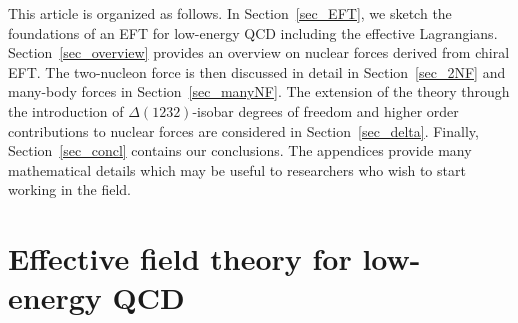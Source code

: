 \documentclass[sort&compress,preprint,3p]{elsarticle}
\begin{document}
This article is organized as follows.
In Section~\ref{sec_EFT}, we sketch the foundations of an EFT for low-energy
QCD including the effective Lagrangians. Section~\ref{sec_overview} provides an overview
on nuclear forces derived from chiral EFT. The two-nucleon force is then discussed in detail in Section~\ref{sec_2NF}
and many-body forces in Section~\ref{sec_manyNF}. 
The extension of the theory through the introduction of $\Delta(1232)$-isobar degrees of freedom
and higher order contributions to nuclear forces are considered in Section~\ref{sec_delta}.
Finally, Section~\ref{sec_concl} contains our conclusions.
The appendices provide many mathematical details which may be useful to researchers
who wish to start working in the field.

\section{Effective field theory for low-energy QCD
\label{sec_EFT}}
\end{document}
